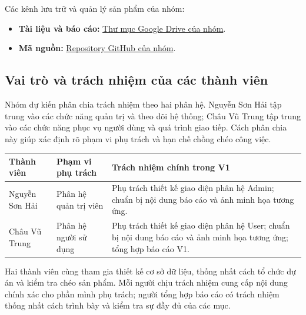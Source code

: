 \noindent Các kênh lưu trữ và quản lý sản phẩm của nhóm:
\begin{itemize}
  \item \textbf{Tài liệu và báo cáo:}
    \href{https://drive.google.com/drive/folders/1Kci4Ug_HXLRbBBFc0h6lVz0RbuvbcJTF?usp=sharing}
    {Thư mục Google Drive của nhóm}.
  \item \textbf{Mã nguồn:}
    \href{https://github.com/nguyenshai/Project-java}
    {Repository GitHub của nhóm}.
\end{itemize}

\clearpage
\subsection{Vai trò và trách nhiệm của các thành viên}
\label{subsec:vai-tro-thanh-vien}

Nhóm dự kiến phân chia trách nhiệm theo hai phân hệ. Nguyễn Sơn Hải tập trung
vào các chức năng quản trị và theo dõi hệ thống; Châu Vũ Trung tập trung vào
các chức năng phục vụ người dùng và quá trình giao tiếp. Cách phân chia này
giúp xác định rõ phạm vi phụ trách và hạn chế chồng chéo công việc.

\begin{center}
\small
{}
\label{tab:vai-tro-thanh-vien}
\begin{tabularx}{\textwidth}{|L{3cm}|L{2.8cm}|Y|}
  \hline
  \textbf{Thành viên} & \textbf{Phạm vi phụ trách} &
  \textbf{Trách nhiệm chính trong V1}\\
  \hline
  Nguyễn Sơn Hải &
  Phân hệ quản trị viên &
  Phụ trách thiết kế giao diện phân hệ Admin; chuẩn bị nội dung báo cáo
  và ảnh minh họa tương ứng.\\
  \hline
  Châu Vũ Trung &
  Phân hệ người sử dụng &
  Phụ trách thiết kế giao diện phân hệ User; chuẩn bị nội dung báo cáo
  và ảnh minh họa tương ứng; tổng hợp báo cáo V1.\\
  \hline
\end{tabularx}
\end{center}

Hai thành viên cùng tham gia thiết kế cơ sở dữ liệu, thống nhất cách tổ chức
dự án và kiểm tra chéo sản phẩm. Mỗi người chịu trách nhiệm cung cấp nội dung
chính xác cho phần mình phụ trách; người tổng hợp báo cáo có trách nhiệm
thống nhất cách trình bày và kiểm tra sự đầy đủ của các mục.

